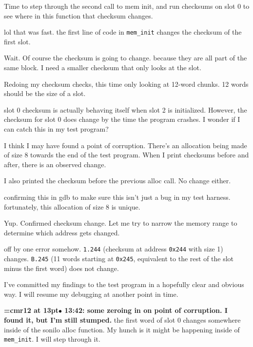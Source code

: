 Time to step through the second call to mem init, and run checksums on slot 0 to see where in this function that checksum changes.
\par

lol that was fast. the first line of code in {\tt mem\_init} changes the checksum of the first slot.
\par

Wait. Of course the checksum is going to change. because they are all part of the same block. I need a smaller checksum that only looks at the slot.
\par

Redoing my checksum checks, this time only looking at 12-word chunks. 12 words should be the size of a slot.
\par

slot 0 checksum is actually behaving itself when slot 2 is initialized. However, the checksum for slot 0 does change by the time the program crashes. I wonder if I can catch this in my test program?
\par

I think I may have found a point of corruption. There's an allocation being made of size 8 towards the end of the test program. When I print checksums before and after, there is an observed change.
\par

I also printed the checksum before the previous alloc call. No change either.
\par

confirming this in gdb to make sure this isn't just a bug in my test harness. fortunately, this allocation of size 8 is unique.
\par

Yup. Confirmed checksum change. Let me try to narrow the memory range to determine which address gets changed.
\par

off by one error somehow. {\tt 1.244} (checksum at address {\tt 0x244} with size 1) changes. {\tt B.245} (11 words starting at {\tt 0x245}, equivalent to the rest of the slot minus the first word) does not change.
\par

I've committed my findings to the test program in a hopefully clear and obvious way. I will resume my debugging at another point in time.
\par

{\smallskip\noindent\bf\font\titlefont=cmr12 at 13pt\titlefont $\bullet$ 13:42: some zeroing in on point of corruption. I found it, but I'm still stumped.}\smallskip
the first word of slot 0 changes somewhere inside of the sonilo alloc function. My hunch is it might be happening inside of {\tt mem\_init}. I will step through it.
\par

